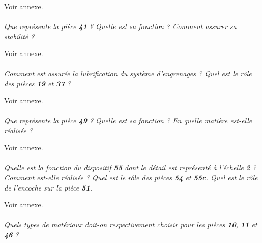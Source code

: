 \documentclass[11pt,oneside]{article}
\begin{document}
Voir annexe.

\paragraph{}
\textit{Que représente la pièce \textbf{41} ? Quelle est sa fonction ? Comment assurer sa stabilité ?}

Voir annexe.

\paragraph{}
\textit{Comment est assurée la lubrification du système d'engrenages ? Quel est le rôle des pièces \textbf{19} et \textbf{37} ?}

Voir annexe.

\paragraph{}
\textit{Que représente la pièce \textbf{49} ? Quelle est sa fonction ? En quelle matière est-elle réalisée ?}

Voir annexe.

\paragraph{}
\textit{Quelle est la fonction du dispositif \textbf{55} dont le détail est représenté à l'échelle 2 ? Comment est-elle réalisée ? Quel est le rôle des pièces \textbf{54} et \textbf{55c}. Quel est le rôle de l'encoche sur la pièce \textbf{51}.}

Voir annexe.

\paragraph{}
\textit{Quels types de matériaux doit-on respectivement choisir pour les pièces \textbf{10}, \textbf{11} et \textbf{46} ?}
\end{document}
